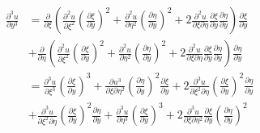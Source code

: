 \documentclass[twoside, 11pt, a4paper]{article}
\begin{document}
\[
  \begin{split}
    \frac{\partial^3u}{\partial y^3} &= \frac{\partial}{\partial\xi}\left(\frac{\partial^2 u}{\partial\xi^2}\left(\frac{\partial\xi}{\partial y}\right)^2 + \frac{\partial^2u}{\partial\eta^2}\left(\frac{\partial\eta}{\partial y}\right)^2 + 2\frac{\partial^2u}{\partial\xi\partial\eta}\frac{\partial\xi}{\partial y}\frac{\partial\eta}{\partial y}\right)\frac{\partial\xi}{\partial y} \\
    &+\frac{\partial}{\partial\eta}\left(\frac{\partial^2 u}{\partial\xi^2}\left(\frac{\partial\xi}{\partial y}\right)^2 + \frac{\partial^2u}{\partial\eta^2}\left(\frac{\partial\eta}{\partial y}\right)^2 + 2\frac{\partial^2u}{\partial\xi\partial\eta}\frac{\partial\xi}{\partial y}\frac{\partial\eta}{\partial y}\right)\frac{\partial\eta}{\partial y} \\
    &= \frac{\partial^3u}{\partial\xi^3}\left(\frac{\partial\xi}{\partial y}\right)^3 + \frac{\partial u^3}{\partial\xi\partial\eta^2}\left(\frac{\partial\eta}{\partial y}\right)^2\frac{\partial\xi}{\partial y} + 2 \frac{\partial^3u}{\partial\xi^2\partial\eta}\left(\frac{\partial\xi}{\partial y}\right)^2\frac{\partial\eta}{\partial y} \\
    &+ \frac{\partial^3 u}{\partial\xi^2\partial\eta}\left(\frac{\partial\xi}{\partial y}\right)^2\frac{\partial\eta}{\partial y} + \frac{\partial^3 u}{\partial\eta^3}\left(\frac{\partial \xi}{\partial y}\right)^3 + 2\frac{\partial^3u}{\partial\xi\partial\eta^2}\frac{\partial\xi}{\partial y}\left(\frac{\partial\eta}{\partial y}\right)^2
  \end{split}
\]
\end{document}
